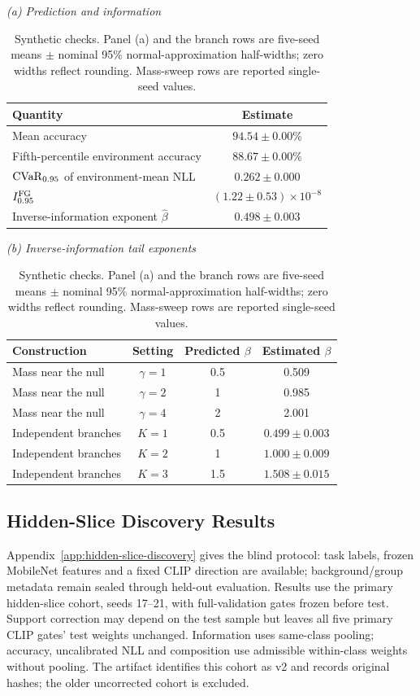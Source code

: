 \begin{table}[htbp]
\centering\small
\setlength{\tabcolsep}{3pt}
\caption{Synthetic checks. Panel (a) and the branch rows are five-seed means $\pm$ nominal 95\% normal-approximation half-widths; zero widths reflect rounding. Mass-sweep rows are reported single-seed values.}
\label{tab:d-synthetic-summary}
\label{tab:d-structural-comparisons}
\textit{(a) Prediction and information}\par\smallskip
\begin{tabular}{@{}lc@{}}
\toprule
Quantity & Estimate \\
\midrule
Mean accuracy & $94.54\pm0.00\%$ \\
Fifth-percentile environment accuracy & $88.67\pm0.00\%$ \\
$\operatorname{CVaR}_{0.95}$ of environment-mean NLL & $0.262\pm0.000$ \\
$I_{0.95}^{\mathrm{FG}}$ & $(1.22\pm0.53)\times10^{-8}$ \\
Inverse-information exponent $\widehat\beta$ & $0.498\pm0.003$ \\
\bottomrule
\end{tabular}
\par\smallskip
\textit{(b) Inverse-information tail exponents}\par\smallskip
\begin{tabular}{@{}lccc@{}}
\toprule
Construction & Setting & Predicted $\beta$ & Estimated $\beta$ \\
\midrule
Mass near the null & $\gamma=1$ & 0.5 & 0.509 \\
Mass near the null & $\gamma=2$ & 1 & 0.985 \\
Mass near the null & $\gamma=4$ & 2 & 2.001 \\
Independent branches & $K=1$ & 0.5 & $0.499\pm0.003$ \\
Independent branches & $K=2$ & 1 & $1.000\pm0.009$ \\
Independent branches & $K=3$ & 1.5 & $1.508\pm0.015$ \\
\bottomrule
\end{tabular}
\par\smallskip
\end{table}


\FloatBarrier
\subsection{Hidden-Slice Discovery Results}
\label{app:discovery-results}

Appendix~\ref{app:hidden-slice-discovery} gives the blind protocol: task labels, frozen MobileNet features and a fixed CLIP direction are available; background/group metadata remain sealed through held-out evaluation. Results use the primary hidden-slice cohort, seeds 17--21, with full-validation gates frozen before test. Support correction may depend on the test sample but leaves all five primary CLIP gates' test weights unchanged. Information uses same-class pooling; accuracy, uncalibrated NLL and composition use admissible within-class weights without pooling. The artifact identifies this cohort as v2 and records original hashes; the older uncorrected cohort is excluded.

